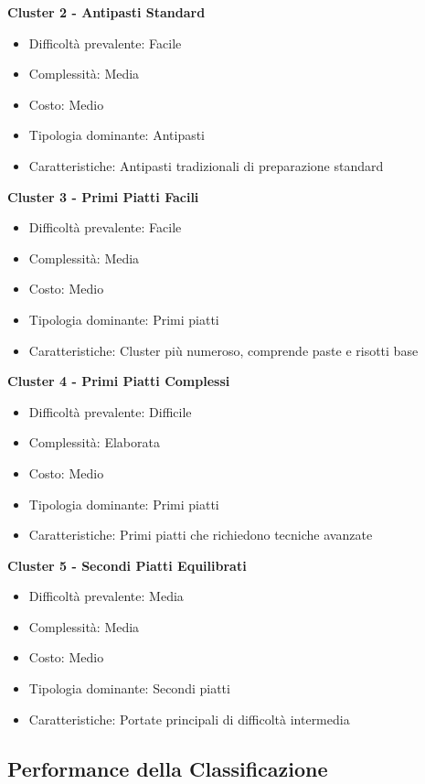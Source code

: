 \documentclass[12pt,a4paper]{article}
\begin{document}
\textbf{Cluster 2 - Antipasti Standard}
\begin{itemize}
    \item Difficoltà prevalente: Facile
    \item Complessità: Media
    \item Costo: Medio
    \item Tipologia dominante: Antipasti
    \item Caratteristiche: Antipasti tradizionali di preparazione standard
\end{itemize}

\textbf{Cluster 3 - Primi Piatti Facili}
\begin{itemize}
    \item Difficoltà prevalente: Facile
    \item Complessità: Media
    \item Costo: Medio
    \item Tipologia dominante: Primi piatti
    \item Caratteristiche: Cluster più numeroso, comprende paste e risotti base
\end{itemize}

\textbf{Cluster 4 - Primi Piatti Complessi}
\begin{itemize}
    \item Difficoltà prevalente: Difficile
    \item Complessità: Elaborata
    \item Costo: Medio
    \item Tipologia dominante: Primi piatti
    \item Caratteristiche: Primi piatti che richiedono tecniche avanzate
\end{itemize}

\textbf{Cluster 5 - Secondi Piatti Equilibrati}
\begin{itemize}
    \item Difficoltà prevalente: Media
    \item Complessità: Media
    \item Costo: Medio
    \item Tipologia dominante: Secondi piatti
    \item Caratteristiche: Portate principali di difficoltà intermedia
\end{itemize}

\subsection{Performance della Classificazione}
\end{document}
